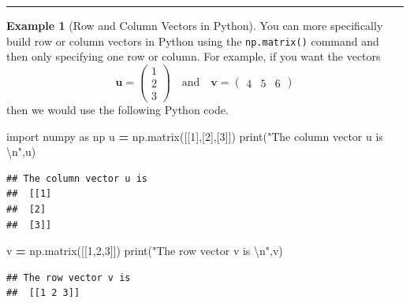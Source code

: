 \documentclass[
]{book}
\newenvironment{Shaded}{\begin{snugshade}}{\end{snugshade}}
\newcommand{\BuiltInTok}[1]{#1}
\newcommand{\CharTok}[1]{\textcolor[rgb]{0.31,0.60,0.02}{#1}}
\newcommand{\DecValTok}[1]{\textcolor[rgb]{0.00,0.00,0.81}{#1}}
\newcommand{\ImportTok}[1]{#1}
\newcommand{\NormalTok}[1]{#1}
\newcommand{\OperatorTok}[1]{\textcolor[rgb]{0.81,0.36,0.00}{\textbf{#1}}}
\newcommand{\StringTok}[1]{\textcolor[rgb]{0.31,0.60,0.02}{#1}}
\theoremstyle{definition}
\theoremstyle{definition}
\newtheorem{example}{Example}[chapter]
\theoremstyle{definition}
\theoremstyle{remark}
\begin{document}
\begin{center}\rule{0.5\linewidth}{0.5pt}\end{center}

\begin{example}[Row and Column Vectors in Python]
\protect\hypertarget{exm:unnamed-chunk-279}{}{\label{exm:unnamed-chunk-279} {} }You can more specifically build row or column vectors in Python using the \texttt{np.matrix()} command and then only specifying one row or column. For example, if you want the vectors
\[ \boldsymbol{u} = \begin{pmatrix} 1\\2\\3\end{pmatrix} \quad \text{and} \quad \boldsymbol{v} = \begin{pmatrix} 4 & 5 & 6 \end{pmatrix} \]
then we would use the following Python code.
\end{example}

\begin{Shaded}
\begin{Highlighting}[]
\ImportTok{import}\NormalTok{ numpy }\ImportTok{as}\NormalTok{ np}
\NormalTok{u }\OperatorTok{=}\NormalTok{ np.matrix([[}\DecValTok{1}\NormalTok{],[}\DecValTok{2}\NormalTok{],[}\DecValTok{3}\NormalTok{]])}
\BuiltInTok{print}\NormalTok{(}\StringTok{"The column vector u is }\CharTok{\textbackslash{}n}\StringTok{"}\NormalTok{,u)}
\end{Highlighting}
\end{Shaded}

\begin{verbatim}
## The column vector u is 
##  [[1]
##  [2]
##  [3]]
\end{verbatim}

\begin{Shaded}
\begin{Highlighting}[]
\NormalTok{v }\OperatorTok{=}\NormalTok{ np.matrix([[}\DecValTok{1}\NormalTok{,}\DecValTok{2}\NormalTok{,}\DecValTok{3}\NormalTok{]])}
\BuiltInTok{print}\NormalTok{(}\StringTok{"The row vector v is }\CharTok{\textbackslash{}n}\StringTok{"}\NormalTok{,v)}
\end{Highlighting}
\end{Shaded}

\begin{verbatim}
## The row vector v is 
##  [[1 2 3]]
\end{verbatim}
\end{document}
